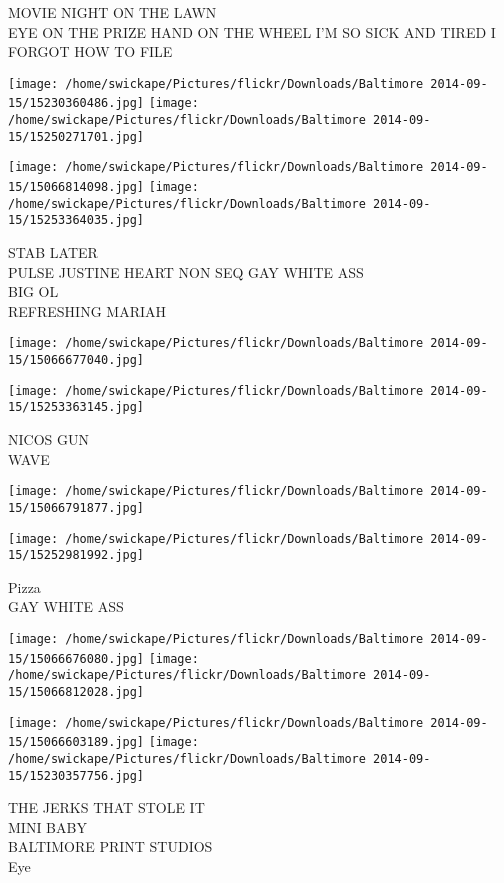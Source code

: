 \documentclass[10pt,letterpaper]{article}
\begin{document}
MOVIE NIGHT ON THE LAWN\\
EYE ON THE PRIZE HAND ON THE WHEEL I'M SO SICK AND TIRED I FORGOT HOW TO FILE
\pagebreak

\texttt{[image: /home/swickape/Pictures/flickr/Downloads/Baltimore 2014-09-15/15230360486.jpg]}
\texttt{[image: /home/swickape/Pictures/flickr/Downloads/Baltimore 2014-09-15/15250271701.jpg]}

\texttt{[image: /home/swickape/Pictures/flickr/Downloads/Baltimore 2014-09-15/15066814098.jpg]}
\texttt{[image: /home/swickape/Pictures/flickr/Downloads/Baltimore 2014-09-15/15253364035.jpg]}

STAB LATER\\
PULSE JUSTINE HEART NON SEQ GAY WHITE ASS\\
BIG OL\\
REFRESHING MARIAH
\pagebreak

\texttt{[image: /home/swickape/Pictures/flickr/Downloads/Baltimore 2014-09-15/15066677040.jpg]}

\vspace{0.25in}
\texttt{[image: /home/swickape/Pictures/flickr/Downloads/Baltimore 2014-09-15/15253363145.jpg]}

NICOS GUN\\
WAVE
\pagebreak

\texttt{[image: /home/swickape/Pictures/flickr/Downloads/Baltimore 2014-09-15/15066791877.jpg]}

\vspace{0.25in}
\texttt{[image: /home/swickape/Pictures/flickr/Downloads/Baltimore 2014-09-15/15252981992.jpg]}

Pizza\\
GAY WHITE ASS
\pagebreak

\texttt{[image: /home/swickape/Pictures/flickr/Downloads/Baltimore 2014-09-15/15066676080.jpg]}
\texttt{[image: /home/swickape/Pictures/flickr/Downloads/Baltimore 2014-09-15/15066812028.jpg]}

\texttt{[image: /home/swickape/Pictures/flickr/Downloads/Baltimore 2014-09-15/15066603189.jpg]}
\texttt{[image: /home/swickape/Pictures/flickr/Downloads/Baltimore 2014-09-15/15230357756.jpg]}

THE JERKS THAT STOLE IT\\
MINI BABY\\
BALTIMORE PRINT STUDIOS\\
Eye
\pagebreak
\end{document}
